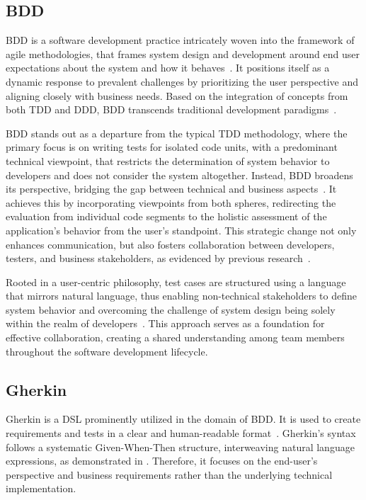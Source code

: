 \label{sec:background}
\subsection{\acl{BDD}}
\label{subsec:bdd}
\acf{BDD} is a software development practice intricately woven into the framework of agile methodologies, that frames system design and development around end user expectations about the system and how it behaves~\cite{BDD_2006}. It positions itself as a dynamic response to prevalent challenges by prioritizing the user perspective and aligning closely with business needs. Based on the integration of concepts from both \ac{TDD} and \ac{DDD}, \ac{BDD} transcends traditional development paradigms~\cite{BDD_2006}.

\ac{BDD} stands out as a departure from the typical \ac{TDD} methodology, where the primary focus is on writing tests for isolated code units, with a predominant technical viewpoint, that restricts the determination of system behavior to developers and does not consider the system altogether. Instead, \ac{BDD} broadens its perspective, bridging the gap between technical and business aspects~\cite{Farooq2023bdd,Binamungu2020bdd}. It achieves this by incorporating viewpoints from both spheres, redirecting the evaluation from individual code segments to the holistic assessment of the application's behavior from the user's standpoint. This strategic change not only enhances communication, but also fosters collaboration between developers, testers, and business stakeholders, as evidenced by previous research~\cite{smart2023bdd,pereira2018behavior}.

Rooted in a user-centric philosophy, test cases are structured using a language that mirrors natural language, thus enabling non-technical stakeholders to define system behavior and overcoming the challenge of system design being solely within the realm of developers~\cite{BDD_2006}. This approach serves as a foundation for effective collaboration, creating a shared understanding among team members throughout the software development lifecycle.

\subsection{Gherkin}
\label{subsec:gherkin}

Gherkin is a \acf{DSL} prominently utilized in the domain of \ac{BDD}. It is used to create requirements and tests in a clear and human-readable format~\cite{noauthor_gherkin_nodate}. Gherkin's syntax follows a systematic Given-When-Then structure, interweaving natural language expressions, as demonstrated in . Therefore, it focuses on the end-user's perspective and business requirements rather than the underlying technical implementation.

